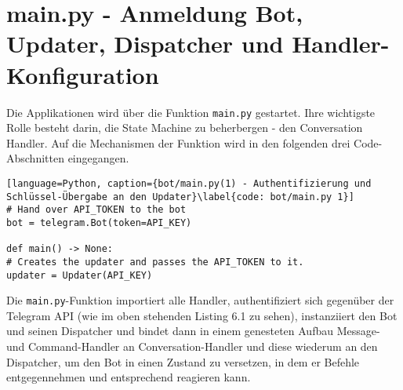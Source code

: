     \section{main.py - Anmeldung Bot, Updater, Dispatcher und Handler-Konfiguration} \label{Implementierung: main.py}
        Die Applikationen wird über die Funktion \verb|main.py| gestartet. Ihre wichtigste Rolle besteht darin, die State Machine zu beherbergen - den Conversation Handler. Auf die Mechanismen der Funktion wird in den folgenden drei Code-Abschnitten eingegangen.
        \begin{lstlisting}[language=Python, caption={bot/main.py(1) - Authentifizierung und Schlüssel-Übergabe an den Updater}\label{code: bot/main.py 1}]
# Hand over API_TOKEN to the bot
bot = telegram.Bot(token=API_KEY)

def main() -> None:
# Creates the updater and passes the API_TOKEN to it.
updater = Updater(API_KEY)
        \end{lstlisting}
        Die \verb|main.py|-Funktion importiert alle Handler, authentifiziert sich gegenüber der Telegram API (wie im oben stehenden Listing 6.1 zu sehen), instanziiert den Bot und seinen Dispatcher und bindet dann in einem genesteten Aufbau Message- und Command-Handler an Conversation-Handler und diese wiederum an den Dispatcher, um den Bot in einen Zustand zu versetzen, in dem er Befehle entgegennehmen und entsprechend reagieren kann. \\
        
